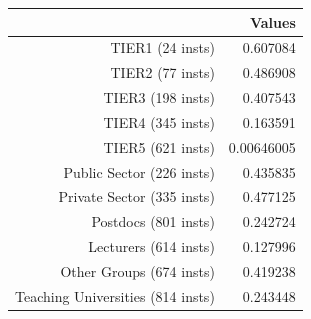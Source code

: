 \begin{tabular}{rr}
  \hline
   & \textbf{Values} \\\hline
  TIER1 (24 insts) & 0.607084 \\
  TIER2 (77 insts) & 0.486908 \\
  TIER3 (198 insts) & 0.407543 \\
  TIER4 (345 insts) & 0.163591 \\
  TIER5 (621 insts) & 0.00646005 \\
  Public Sector (226 insts) & 0.435835 \\
  Private Sector (335 insts) & 0.477125 \\
  Postdocs (801 insts) & 0.242724 \\
  Lecturers (614 insts) & 0.127996 \\
  Other Groups (674 insts) & 0.419238 \\
  Teaching Universities (814 insts) & 0.243448 \\\hline
\end{tabular}
